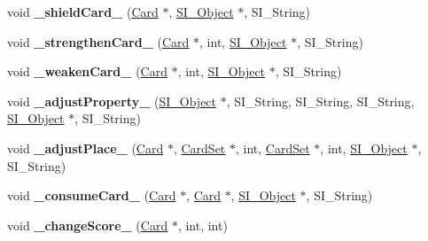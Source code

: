 \begin{DoxyCompactItemize}
\item 
\mbox{\label{class_field_a4c335ffdfde26fcf68939b45ce5b4bdd}} 
void {\bfseries \+\_\+shield\+Card\+\_\+} (\hyperlink{class_card}{Card} $\ast$, \hyperlink{class_s_i___object}{S\+I\+\_\+\+Object} $\ast$, S\+I\+\_\+\+String)
\item 
\mbox{\label{class_field_a5bf0e19326f81c126b2f47234b2c6a69}} 
void {\bfseries \+\_\+strengthen\+Card\+\_\+} (\hyperlink{class_card}{Card} $\ast$, int, \hyperlink{class_s_i___object}{S\+I\+\_\+\+Object} $\ast$, S\+I\+\_\+\+String)
\item 
\mbox{\label{class_field_a36950eed3461b27df18181ec04cb25c0}} 
void {\bfseries \+\_\+weaken\+Card\+\_\+} (\hyperlink{class_card}{Card} $\ast$, int, \hyperlink{class_s_i___object}{S\+I\+\_\+\+Object} $\ast$, S\+I\+\_\+\+String)
\item 
\mbox{\label{class_field_a87778738ca013be03b8aa5bc6a8ef513}} 
void {\bfseries \+\_\+adjust\+Property\+\_\+} (\hyperlink{class_s_i___object}{S\+I\+\_\+\+Object} $\ast$, S\+I\+\_\+\+String, S\+I\+\_\+\+String, S\+I\+\_\+\+String, \hyperlink{class_s_i___object}{S\+I\+\_\+\+Object} $\ast$, S\+I\+\_\+\+String)
\item 
\mbox{\label{class_field_a42bfc05297e92135641cf932ca3e8447}} 
void {\bfseries \+\_\+adjust\+Place\+\_\+} (\hyperlink{class_card}{Card} $\ast$, \hyperlink{class_card_set}{Card\+Set} $\ast$, int, \hyperlink{class_card_set}{Card\+Set} $\ast$, int, \hyperlink{class_s_i___object}{S\+I\+\_\+\+Object} $\ast$, S\+I\+\_\+\+String)
\item 
\mbox{\label{class_field_a34fc1cff2e3215ae551f757dd63c1b09}} 
void {\bfseries \+\_\+consume\+Card\+\_\+} (\hyperlink{class_card}{Card} $\ast$, \hyperlink{class_card}{Card} $\ast$, \hyperlink{class_s_i___object}{S\+I\+\_\+\+Object} $\ast$, S\+I\+\_\+\+String)
\item 
\mbox{\label{class_field_a54147d040fba163becc85ea25d483f41}} 
void {\bfseries \+\_\+change\+Score\+\_\+} (\hyperlink{class_card}{Card} $\ast$, int, int)
\end{DoxyCompactItemize}
